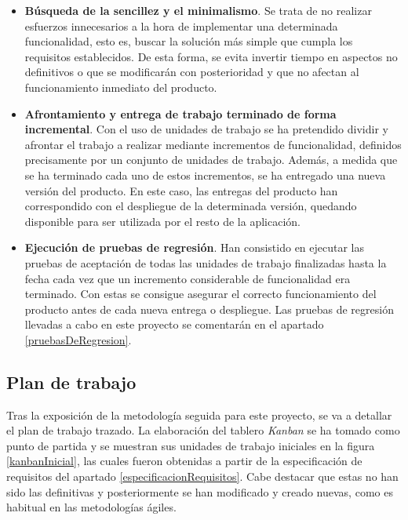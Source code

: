 \documentclass[11pt,spanish,listoffigures]{tfgetsinf}
\begin{document}
\begin{itemize}
	\item \textbf{Búsqueda de la sencillez y el minimalismo}. Se trata de no realizar esfuerzos innecesarios a la hora de implementar una determinada funcionalidad, esto es, buscar la solución más simple que cumpla los requisitos establecidos. De esta forma, se evita invertir tiempo en aspectos no definitivos o que se modificarán con posterioridad y que no afectan al funcionamiento inmediato del producto.

	\item \textbf{Afrontamiento y entrega de trabajo terminado de forma incremental}. Con el uso de unidades de trabajo se ha pretendido dividir y afrontar el trabajo a realizar mediante incrementos de funcionalidad, definidos precisamente por un conjunto de unidades de trabajo. Además, a medida que se ha terminado cada uno de estos incrementos, se ha entregado una nueva versión del producto. En este caso, las entregas del producto han correspondido con el despliegue de la determinada versión, quedando disponible para ser utilizada por el resto de la aplicación.

	\item \textbf{Ejecución de pruebas de regresión}. Han consistido en ejecutar las pruebas de aceptación de todas las unidades de trabajo finalizadas hasta la fecha cada vez que un incremento considerable de funcionalidad era terminado. Con estas se consigue asegurar el correcto funcionamiento del producto antes de cada nueva entrega o despliegue. Las pruebas de regresión llevadas a cabo en este proyecto se comentarán en el apartado \ref{pruebasDeRegresion}.

\end{itemize}


		\subsection{Plan de trabajo} \label{planDeTrabajo}

Tras la exposición de la metodología seguida para este proyecto, se va a detallar el plan de trabajo trazado. La elaboración del tablero \emph{Kanban} se ha tomado como punto de partida y se muestran sus unidades de trabajo iniciales en la figura \ref{kanbanInicial}, las cuales fueron obtenidas a partir de la especificación de requisitos del apartado \ref{especificacionRequisitos}. Cabe destacar que estas no han sido las definitivas y posteriormente se han modificado y creado nuevas, como es habitual en las metodologías ágiles.
\end{document}
